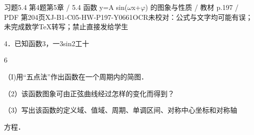 \begin{bankitem}{习题5.4 第4题}{第5章 / 5.4 函数 y=A sin(\ensuremath{\omega}x+\ensuremath{\varphi}) 的图象与性质 / 教材 p.197 / PDF 第204页}{XJ-B1-C05-HW-P197-Y0661}{OCR未校对：公式与文字均可能有误；未完成数学TeX转写；禁止直接发给学生}
\begin{ocrdraft}
\par
4．已知函数3，一3sin2工十
\par
6
\par
（I)用“五点法”作出函数在一个周期内的简图．
\par
（2）该函数图象可由正弦曲线经过怎样的变化而得到？
\par
（3）写出该函数的定义域、值域、周期、单调区间、对称中心坐标和对称轴
\par
方程．
\end{ocrdraft}
\end{bankitem}
